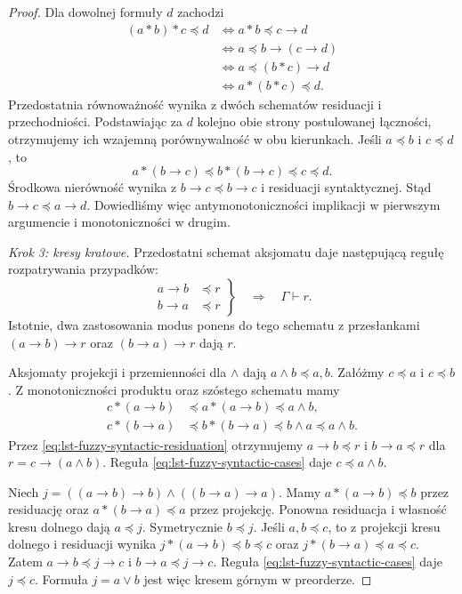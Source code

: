 \begin{proof}
Dla dowolnej formuły $d$ zachodzi
\[
\begin{split}
 (a*b)*c\preccurlyeq d
 &\iff a*b\preccurlyeq c\to d\\
 &\iff a\preccurlyeq b\to(c\to d)\\
 &\iff a\preccurlyeq (b*c)\to d\\
 &\iff a*(b*c)\preccurlyeq d.
\end{split}
\]
Przedostatnia równoważność wynika z dwóch schematów
residuacji i przechodniości. Podstawiając za $d$ kolejno
obie strony postulowanej łączności, otrzymujemy ich
wzajemną porównywalność w obu kierunkach.
Jeśli $a\preccurlyeq b$ i $c\preccurlyeq d$, to
\[
 a*(b\to c)\preccurlyeq b*(b\to c)
 \preccurlyeq c\preccurlyeq d.
\]
Środkowa nierówność wynika z
$b\to c\preccurlyeq b\to c$ i residuacji syntaktycznej.
Stąd $b\to c\preccurlyeq a\to d$.
Dowiedliśmy więc antymonotoniczności implikacji w pierwszym
argumencie i monotoniczności w drugim.

\emph{Krok 3: kresy kratowe.}
Przedostatni schemat aksjomatu daje następującą regułę
rozpatrywania przypadków:
\begin{equation}\label{eq:lst-fuzzy-syntactic-cases}
 \left.
 \begin{aligned}
 a\to b&\preccurlyeq r\\
 b\to a&\preccurlyeq r
 \end{aligned}
 \right\}\quad\Longrightarrow\quad\Gamma\vdash r.
\end{equation}
Istotnie, dwa zastosowania modus ponens do tego schematu
z przesłankami $(a\to b)\to r$ oraz $(b\to a)\to r$
dają $r$.

Aksjomaty projekcji i przemienności dla $\wedge$ dają
$a\wedge b\preccurlyeq a,b$.
Załóżmy $c\preccurlyeq a$ i $c\preccurlyeq b$.
Z monotoniczności produktu oraz szóstego schematu mamy
\[
\begin{split}
 c*(a\to b)&\preccurlyeq a*(a\to b)
              \preccurlyeq a\wedge b,\\
 c*(b\to a)&\preccurlyeq b*(b\to a)
              \preccurlyeq b\wedge a
              \preccurlyeq a\wedge b.
\end{split}
\]
Przez \eqref{eq:lst-fuzzy-syntactic-residuation} otrzymujemy
$a\to b\preccurlyeq r$ i $b\to a\preccurlyeq r$
dla $r=c\to(a\wedge b)$. Reguła
\eqref{eq:lst-fuzzy-syntactic-cases} daje
$c\preccurlyeq a\wedge b$.

Niech $j=((a\to b)\to b)\wedge((b\to a)\to a)$.
Mamy $a*(a\to b)\preccurlyeq b$ przez residuację oraz
$a*(b\to a)\preccurlyeq a$ przez projekcję.
Ponowna residuacja i własność kresu dolnego dają
$a\preccurlyeq j$. Symetrycznie $b\preccurlyeq j$.
Jeśli $a,b\preccurlyeq c$, to z projekcji kresu dolnego
i residuacji wynika
$j*(a\to b)\preccurlyeq b\preccurlyeq c$ oraz
$j*(b\to a)\preccurlyeq a\preccurlyeq c$.
Zatem $a\to b\preccurlyeq j\to c$ i
$b\to a\preccurlyeq j\to c$. Reguła
\eqref{eq:lst-fuzzy-syntactic-cases} daje $j\preccurlyeq c$.
Formuła $j=a\vee b$ jest więc kresem górnym w preorderze.


\end{proof}
